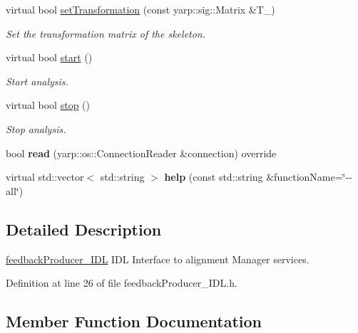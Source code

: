 \begin{DoxyCompactItemize}
virtual bool \hyperlink{classfeedbackProducer__IDL_a0faabb9844bf01590a85e67bd857d7ac}{set\+Transformation} (const yarp\+::sig\+::\+Matrix \&T\+\_\+)
\begin{DoxyCompactList}\small\item\em Set the transformation matrix of the skeleton. \end{DoxyCompactList}\item 
virtual bool \hyperlink{classfeedbackProducer__IDL_a50c492862766e36f730439a3a8f0d910}{start} ()
\begin{DoxyCompactList}\small\item\em Start analysis. \end{DoxyCompactList}\item 
virtual bool \hyperlink{classfeedbackProducer__IDL_afdfffd0edb784e0a9906ed33e164027b}{stop} ()
\begin{DoxyCompactList}\small\item\em Stop analysis. \end{DoxyCompactList}\item 
\mbox{\label{classfeedbackProducer__IDL_a6b15cd2302f577f6285099ec7f0bc043}} 
bool {\bfseries read} (yarp\+::os\+::\+Connection\+Reader \&connection) override
\item 
\mbox{\label{classfeedbackProducer__IDL_ab5c65785efc4edbc2d605511f4028c9f}} 
virtual std\+::vector$<$ std\+::string $>$ {\bfseries help} (const std\+::string \&function\+Name=\char`\"{}-\/-\/all\char`\"{})
\end{DoxyCompactItemize}


\subsection{Detailed Description}
\hyperlink{classfeedbackProducer__IDL}{feedback\+Producer\+\_\+\+I\+DL} I\+DL Interface to alignment Manager services. 

Definition at line 26 of file feedback\+Producer\+\_\+\+I\+D\+L.\+h.



\subsection{Member Function Documentation}
\mbox{\label{classfeedbackProducer__IDL_a509606998529f964664fa22b4457cee2}} 
